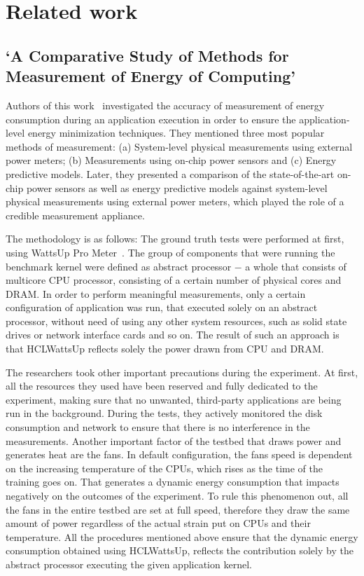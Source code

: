 \chapter{Related work}

\section{`A Comparative Study of Methods for Measurement
of Energy of Computing'}

Authors of this work~\cite{State_of_the_Art_Article_1}
investigated the accuracy of measurement of energy consumption
during an application execution in order to ensure the
application-level energy minimization techniques.
They mentioned three most popular methods of measurement:
(a) System-level physical measurements using external power meters;
(b) Measurements using on-chip power sensors and (c) Energy
predictive models. Later, they presented a comparison of the
state-of-the-art on-chip power sensors as well as energy
predictive models against system-level physical measurements
using external power meters, which played the role of a credible
measurement appliance.

The methodology is as follows: The ground truth tests were
performed at first, using WattsUp Pro
Meter~\cite{WattsUp_Quick_Reference_Guide}. The group of
components that were running the benchmark kernel were defined
as abstract processor $-$ a whole that consists of multicore CPU
processor, consisting of a certain number of physical cores and
DRAM\@. In order to perform meaningful measurements, only a certain
configuration of application was run, that executed solely on an
abstract processor, without need of using any other system
resources, such as solid state drives or network interface cards
and so on. The result of such an approach is that HCLWattsUp
reflects solely the power drawn from CPU and DRAM\@.

The researchers took other important precautions during the
experiment. At first, all the resources they used have been
reserved and fully dedicated to the experiment, making sure
that no unwanted, third-party applications are being run in
the background. During the tests, they actively monitored the
disk consumption and network to ensure that there is no
interference in the measurements. Another important factor of
the testbed that draws power and generates heat are the fans.
In default configuration, the fans speed is dependent on the
increasing temperature of the CPUs, which rises as the time of
the training goes on. That generates a dynamic energy consumption
that impacts negatively on the outcomes of the experiment.
To rule this phenomenon out, all the fans in the entire testbed
are set at full speed, therefore they draw the same amount of
power regardless of the actual strain put on CPUs and their
temperature. All the procedures mentioned above ensure that the
dynamic energy consumption obtained using HCLWattsUp, reflects
the contribution solely by the abstract processor executing the
given application kernel.


